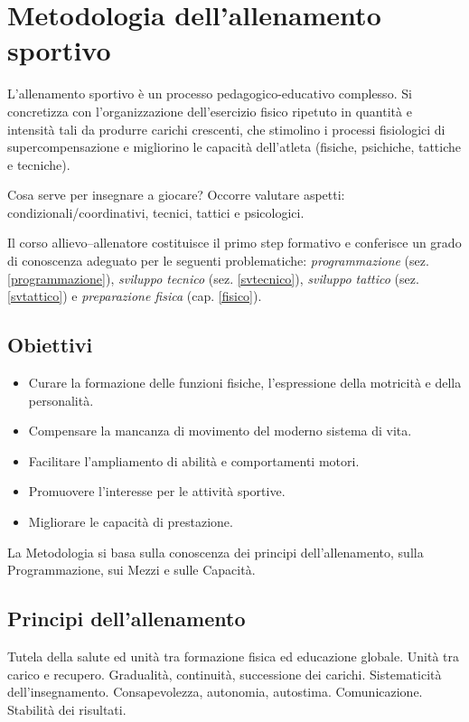 \chapter{Metodologia dell'allenamento sportivo}

L'allenamento sportivo è un processo pedagogico-educativo complesso. Si concretizza con l'organizzazione dell'esercizio fisico ripetuto in quantità e intensità tali da produrre carichi crescenti, che stimolino i processi fisiologici di supercompensazione e migliorino le capacità dell'atleta (fisiche, psichiche, tattiche e tecniche).

Cosa serve per insegnare a giocare?
Occorre valutare aspetti: condizionali/coordinativi, tecnici, tattici e psicologici.

\begin{libro}
Il corso allievo--allenatore costituisce il primo step formativo e conferisce
un grado di conoscenza adeguato per le seguenti problematiche:
\emph{programmazione} (sez. \ref{programmazione}),
\emph{sviluppo tecnico} (sez. \ref{svtecnico}),
\emph{sviluppo tattico} (sez. \ref{svtattico})
e \emph{preparazione fisica} (cap. \ref{fisico}).
\end{libro}

\section{Obiettivi}
\begin{itemize}
\item Curare la formazione delle funzioni fisiche, l'espressione della motricità e della personalità.
\item Compensare la mancanza di movimento del moderno sistema di vita.
\item Facilitare l'ampliamento di abilità e comportamenti motori.
\item Promuovere l'interesse per le attività sportive.
\item Migliorare le capacità di prestazione.
\end{itemize}

La Metodologia si basa sulla conoscenza dei principi dell'allenamento, sulla Programmazione, sui Mezzi e sulle Capacità.

\section{Principi dell'allenamento}
Tutela della salute ed unità tra formazione fisica ed educazione globale.
Unità tra carico e recupero.
Gradualità, continuità, successione dei carichi.
Sistematicità dell'insegnamento.
Consapevolezza, autonomia, autostima.
Comunicazione.
Stabilità dei risultati.


